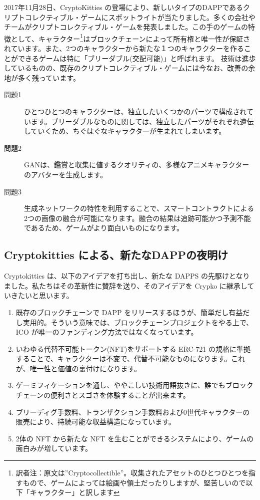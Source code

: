 \documentclass[xelatex,ja=standard]{bxjsarticle}
\begin{document}
2017年11月28日、CryptoKitties\cite{cryptokitties} の登場により、新しいタイプのDAPPであるクリプトコレクティブル・ゲームにスポットライトが当たりました。多くの会社やチームがクリプトコレクティブル・ゲームを発表しました\cite{cryptomons,cryptocountries,cryptopets,cryptoarts,cryptolandmarks,cryptofighters,etheremon,etherwaifu}。この手のゲームの特徴として、キャラクター\footnote{訳者注：原文は”Cryptocollectible”。収集されたアセットのひとつひとつを指すもので、ゲームによっては絵画や領土だったりしますが、堅苦しいので以下「キャラクター」と訳します}はブロックチェーンによって所有権と唯一性が保証されています。また、2つのキャラクターから新たな１つのキャラクターを作ることができるゲームは特に「ブリーダブル(交配可能)」と呼ばれます。
技術は進歩しているものの、既存のクリプトコレクティブル・ゲームには今なお、改善の余地が多く残っています。
\begin{description}
\item [問題1\label{problem:1}] ひとつひとつのキャラクターは、独立したいくつかのパーツで構成されています。ブリーダブルなものに関しては、独立したパーツがそれぞれ遺伝していくため、ちぐはぐなキャラクターが生まれてしまいます。
\item [問題2\label{problem:2}] GANは、鑑賞と収集に値するクオリティの、多様なアニメキャラクターのアバターを生成します。
\item [問題3\label{problem:3}] 生成ネットワークの特性を利用することで、スマートコントラクトによる2つの画像の融合が可能になります。融合の結果は追跡可能かつ予測不能であるため、ゲームがより面白いものになります。
\end{description} 

\subsection{Cryptokitties による、新たなDAPPの夜明け}

Cryptokitties は、以下のアイデアを打ち出し、新たな DAPPS の先駆けとなりました。私たちはその革新性に賛辞を送り、そのアイデアを Crypko に継承していきたいと思います。

\begin{enumerate}
\item 既存のブロックチェーンで DAPP をリリースするほうが、簡単だし有益だし実用的。そういう意味では、ブロックチェーンプロジェクトをやる上で、ICO が唯一のファンディング方法ではなくなっています。
\item いわゆる代替不可能トークン(NFT)をサポートする ERC-721 の規格に準拠することで、キャラクターは不変で、代替不可能なものになります。これが、唯一性と価値の裏付けになります。
\item ゲーミフィケーションを通し、ややこしい技術用語抜きに、誰でもブロックチェーンの便利さとスゴさを体験することが出来ます。
\item ブリーディグ手数料、トランザクション手数料および0世代キャラクターの販売により、持続可能な収益構造になっています。
\item 2体の NFT から新たな NFT を生むことができるシステムにより、ゲームの面白みが増しています。
\end{enumerate}
\end{document}
